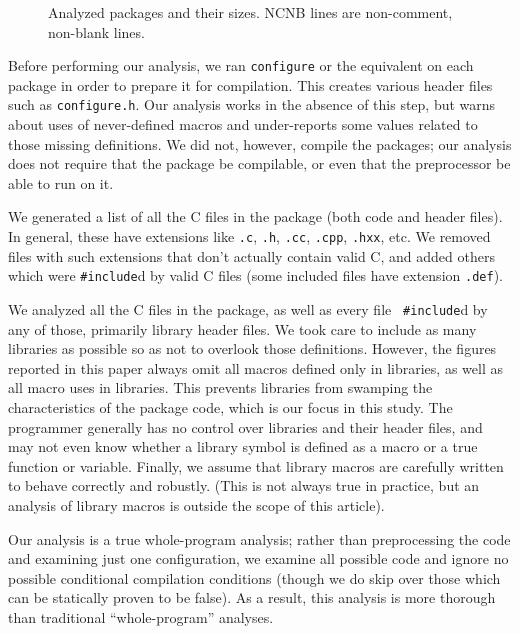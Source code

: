 \documentclass[10pt]{article}
\def\typeofdocument{article}
\newcommand{\file}[1]{\texttt{#1}}
\newcommand{\captionsmall}[1]{\caption[]{\small #1}}
\begin{document}
\begin{figure}
\centering
{%
  \small
  \setlength{\tabcolsep}{.25em}
  
}
\captionsmall{Analyzed packages and their sizes.  NCNB lines are non-comment,
  non-blank lines.}
\label{fig:packages}
\end{figure}

Before performing our analysis, we ran {\tt configure} or the equivalent on
each package in order to prepare it for compilation.  This creates various
header files such as \file{configure.h}.  Our analysis works in the
absence of this step, but warns about uses of never-defined macros and
under-reports some values related to those missing definitions.  We did
not, however, compile the packages; our analysis does not require that the
package be compilable, or even that the preprocessor be able to run on it.

We generated a list of all the C files in the package (both code and header
files).  In general, these have extensions like \file{.c}, \file{.h},
\file{.cc}, \file{.cpp}, \file{.hxx}, etc.  We removed files with such
extensions that don't actually contain valid C, and added others which were
{\tt \#include}d by valid C files (some included files have extension
\file{.def}).

We analyzed all the C files in the package, as well as every file {\tt
\#include}d by any of those, primarily library header files.  We
took care to include as many libraries as possible so as not to overlook
those definitions.  However, the figures reported in this paper always omit
all macros defined only in libraries, as well as all macro uses in
libraries.  This prevents libraries from swamping the characteristics of
the package code, which is our focus in this study.  The programmer
generally has no control over libraries and their header files, and may not
even know whether a library symbol is defined as a macro or a true function
or variable.  Finally, we assume that library macros are carefully written
to behave correctly and robustly.  (This is not always true in practice,
but an analysis of library macros is outside the scope of this
\typeofdocument).

Our analysis is a true whole-program analysis; rather than preprocessing the
code and examining just one configuration, we examine all possible code and
ignore no possible  conditional compilation conditions (though we do skip
over those which can be statically proven to be false).   As a result, this
analysis is more thorough than traditional ``whole-program'' analyses.
\end{document}
